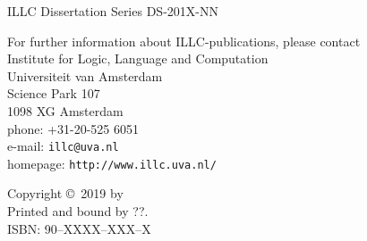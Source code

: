 
{\pagestyle{empty}

\makeatletter
\newcommand{\thetitle}{\@title}
\newcommand{\theauthor}{\@author}
\makeatother
\newcommand{\printtitle}{{\Huge\bf \thetitle}}

\begin{titlepage}
\par\vskip 2cm
\begin{center}
\printtitle
\vfill
{\LARGE\bf \theauthor}
\vskip 2cm
\end{center}
\end{titlepage}

\mbox{}\newpage
\setcounter{page}{1}

\par\vskip 2cm
\begin{center}
\printtitle
\end{center}

\clearpage
\par\vskip 2cm
\begin{center}
ILLC Dissertation Series DS-201X-NN                         %
\par\vspace {2cm}
\illclogo{10cm}
\par\vspace {2cm}
\noindent%
For further information about ILLC-publications, please contact\\[2ex]
Institute for Logic, Language and Computation\\
Universiteit van Amsterdam\\
Science Park 107\\
1098 XG Amsterdam\\
phone: +31-20-525 6051\\
e-mail: {\tt illc@uva.nl}\\
homepage: {\tt http://www.illc.uva.nl/}
\end{center}
\vfill

\noindent%
Copyright \copyright\ 2019 by \theauthor \\[2ex]
Printed and bound by ??.\\[2ex]                             %
ISBN: 90--XXXX--XXX--X                                      %

}

